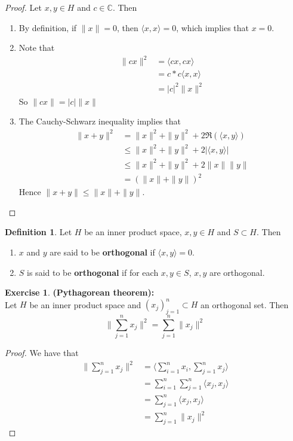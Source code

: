 \documentclass[12pt]{amsart}
\theoremstyle{definition}
\newtheorem{defn}[definition]{Definition}
\newtheorem{ex}[definition]{Exercise}
\newcommand{\C}{\mathbb{C}}
\newcommand{\tbf}[1]{\textbf{#1}}
\renewcommand{\r}{\rangle}
\renewcommand{\l}{\langle}
\DeclareMathOperator*{\0}{\mbf{0}}
\DeclareMathOperator*{\1}{\mbf{1}}
\newcommand{\lex}[1]{\label{ex:#1}}
\newcommand{\ld}[1]{\label{defn:#1}}
\begin{document}
\begin{proof}Let $x,y \in H$ and $c \in \C$. Then
\begin{enumerate}
\item By definition, if $\|x\| = 0$, then $\l x, x \r =0$, which implies that $x =0$.
\item Note that 
\begin{align*}
\| cx \|^2 
&= \l cx, cx \r \\
&= c*c \l x, x\r \\
&= |c|^2\| x \|^2
\end{align*}
So $\| cx \| = |c|\|x\|$
\item The Cauchy-Schwarz inequality implies that
\begin{align*}
\|x + y\|^2 
&= \|x\|^2 + \|y\|^2 + 2 \Re(\l x, y\r) \\
& \leq \|x\|^2 + \|y\|^2 + 2 |\l x, y\r | \\
& \leq \|x\|^2 + \|y\|^2 + 2 \|x\| \|y\| \\
&= (\|x\| + \|y\|)^2
\end{align*}
Hence $\|x + y\| \leq \|x\| + \|y\|$.
\end{enumerate}
\end{proof}

\begin{defn} \ld{}
	Let $H$ be an inner product space, $x, y \in H$ and $S \subset H$. Then
	\begin{enumerate}
	\item $x$ and $y$ are said to be \tbf{orthogonal} if $\l x,y\r = 0$. 
	\item $S$ is said to be \tbf{orthogonal} if for each $x,y \in S$, $x,y$ are orthogonal. 
	\end{enumerate}
\end{defn}

\begin{ex} \lex{}\tbf{(Pythagorean theorem):}\\
	Let $H$ be an inner product space and $(x_j)_{j =1}^n \subset H$ an orthogonal set. Then $$\bigg \|\sum\limits_{j = 1}^n x_j  \bigg \|^2 = \sum\limits_{j =1}^n \|x_j \|^2$$
\end{ex}

\begin{proof}
	We have that
	\begin{align*}
		\bigg \| \sum\limits_{j = 1}^n  x_j\bigg \|^2
		&= \bigg \l \sum\limits_{i =1}^n x_i , \sum\limits_{j =1}^n x_j \bigg \r \\
		&= \sum\limits_{i =1}^n \sum\limits_{j =1}^n \l x_j , x_j \r \\
		&= \sum\limits_{j =1}^n \l x_j , x_j \r \\
		&= \sum\limits_{j =1}^n \| x_j \|^2
	\end{align*}
\end{proof}
\end{document}
